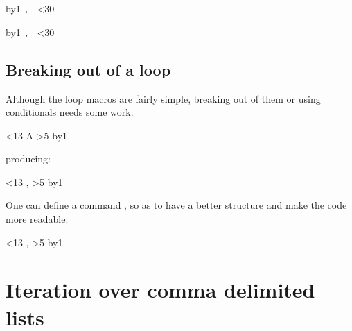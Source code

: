 \begin{teX}
\def\for#1\endfor{\def\body{#1}\iterate}
\def\iterate{\body\let\next=\iterate\else\let\next=\relax\fi\next}
\newcount\n
{}
\for
   \advance\n by1
     \texttt{\number\n, }  
   \ifnum\n<30
\endfor
\end{teX}  

\begingroup
\def\for#1\endfor{\def\body{#1}\iterate}
\def\iterates{\body\let\next=\iterates\else\let\next=\relax\fi\next}

\noindent\colorbox{gray!10}{\parbox{10cm}{\noindent
\newcount\n
{}
\for%
   \advance\n by1
     \texttt{\number\n, }%
   \ifnum\n<30%
\endfor%
}}
\endgroup


\subsection{Breaking out of a loop}

Although the loop macros are fairly simple, breaking out of them or using conditionals needs some work.

\begin{teXXX}
\newcount\mycount
{}
\loop\ifnum\mycount<13
A 
\ifnum\mycount>5
    \let\iterate\relax
 \fi
 \advance\mycount by1\relax
\repeat
\end{teXXX}
\medskip
producing:
\medskip

\def\graybox#1{%
\noindent\colorbox{gray!10}{\parbox{10cm}{\noindent#1}}\par\medskip}

\graybox{
\newcount\mycount
{}
\loop\ifnum\mycount<13
\the\mycount, 
\ifnum\mycount>5
    \let\iterate\relax
 \fi
 \advance\mycount by1\relax
\repeat
}

One can define a command , so as to have a better structure and make the code more readable:

\begin{teXXX}
\def\break{\let\iterate\relax}
\newcount\mycount
{}
\loop\ifnum\mycount<13
\the\mycount, 
\ifnum\mycount>5
    \break    
\fi
\advance\mycount by1\relax
\repeat
\end{teXXX}





\section{Iteration over comma delimited lists}

